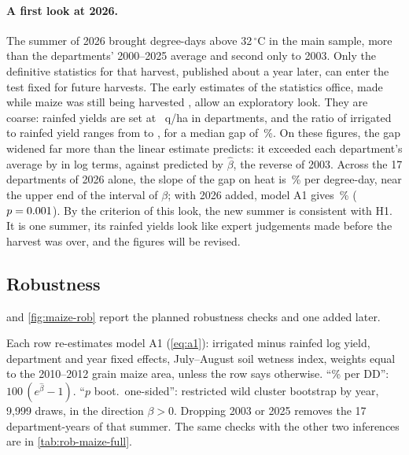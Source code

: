\paragraph{A first look at 2026.} The summer of 2026 brought \TwentySixHeat{} degree-days above 32\,$^{\circ}$C in the main sample, \TwentySixHeatDev{} more than the departments' 2000--2025 average and second only to 2003. Only the definitive statistics for that harvest, published about a year later, can enter the test fixed for future harvests. The early estimates of the statistics office, made while maize was still being harvested \parencite{agreste2026conjoncture}, allow an exploratory look. They are coarse: rainfed yields are set at \TwentySixRainMin~q/ha in \TwentySixRainMinN{} departments, and the ratio of irrigated to rainfed yield ranges from \TwentySixRatioMin{} to \TwentySixRatioMax{}, for a median gap of \TwentySixGapMed\,\%. On these figures, the gap widened far more than the linear estimate predicts: it exceeded each department's average by \TwentySixGapObs{} in log terms, against \TwentySixGapPred{} predicted by $\hat\beta$, the reverse of 2003. Across the 17 departments of 2026 alone, the slope of the gap on heat is \TwentySixSlopePct\,\% per degree-day, near the upper end of the interval of $\beta$; with 2026 added, model A1 gives \TwentySixAllPct\,\% ($p = 0.001$). By the criterion of this look, the new summer is consistent with H1. It is one summer, its rainfed yields look like expert judgements made before the harvest was over, and the figures will be revised.

\subsection{Robustness}

 and \cref{fig:maize-rob} report the planned robustness checks and one added later.

\begin{table}[H]
\centering
\small
\caption{Maize: robustness of the main estimate}
\label{tab:maize-rob}
\begin{threeparttable}

\begin{tablenotes}\footnotesize
\item Each row re-estimates model A1 (\cref{eq:a1}): irrigated minus rainfed log yield, department and year fixed effects, July--August soil wetness index, weights equal to the 2010--2012 grain maize area, unless the row says otherwise. ``\% per DD'': $100\,(e^{\hat\beta}-1)$. ``$p$ boot.\ one-sided'': restricted wild cluster bootstrap by year, 9,999 draws, in the direction $\beta > 0$. Dropping 2003 or 2025 removes the 17 department-years of that summer. The same checks with the other two inferences are in \cref{tab:rob-maize-full}.
\end{tablenotes}
\end{threeparttable}
\end{table}

